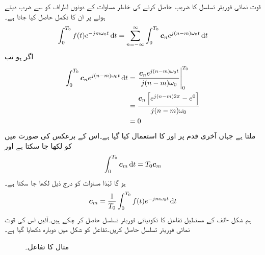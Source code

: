 قوت نمائی فوریئر تسلسل کا  ضریب   حاصل کرنے کی خاطر مساوات  کے دونوں اطراف کو  سے ضرب دیتے ہوئے  پر ان کا تکمل حاصل کیا جاتا ہے۔
\begin{align}\label{مساوات_فوریئر_عددی_سر_قوت_نما_الف}
\int_0^{T_0}f(t)e^{-jm\omega_0 t} \dif t=\sum_{n=-\infty}^{\infty} \int_0^{T_0}\kx{c}_ne^{j(n-m)\omega_0 t} \dif t
\end{align}
اگر  ہو تب
\begin{align*}
\int_0^{T_0} \kx{c}_ne^{j(n-m)\omega_0 t} \dif t&=\left. \frac{\kx{c}_ne^{j(n-m)\omega_0 t}}{j(n-m)\omega_0}\right|_0^{T_0}\\
&=\frac{\kx{c}_n \left[e^{j(n-m)2\pi}-e^{0}\right]}{j(n-m)\omega_0}\\
&=0
\end{align*}
ملتا ہے جہاں آخری قدم پر  اور  کا استعمال کیا گیا ہے۔اس کے برعکس  کی صورت میں  کو  لکھا جا سکتا ہے اور
\begin{align*}
\int_0^{T_0} \kx{c}_m \dif t=T_0 \kx{c}_m
\end{align*}
ہو گا لہٰذا مساوات  کو درج ذیل لکھا جا سکتا ہے۔
\begin{align}\label{مساوات_فوریئر_عددی_سر_قوت_نما_ب}
\kx{c}_m=\frac{1}{T_0} \int_0^{T_0} f(t) e^{-jm\omega_0 t} \dif t
\end{align}
ہم شکل -الف کے مستطیل تفاعل کا تکونیاتی فوریئر تسلسل حاصل کر چکے ہیں۔آئیں اس کی قوت نمائی فوریئر تسلسل حاصل کریں۔تفاعل کو شکل  میں دوبارہ دکھایا گیا ہے۔
\begin{figure}
\centering
{}
\caption{مثال  کا تفاعل۔}
\label{شکل_فوریئر_دندان_دوبارہ}
\end{figure}%

